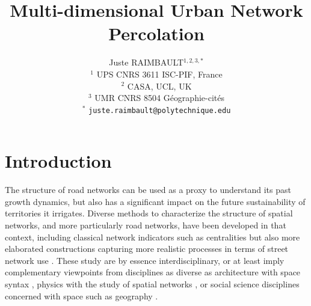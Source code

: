 \documentclass{article}
\begin{document}
\title{Multi-dimensional Urban Network Percolation}



\author{Juste RAIMBAULT$^{1,2,3,\ast}$\\
$^1$ UPS CNRS 3611 ISC-PIF, France\\
$^2$ CASA, UCL, UK\\
$^3$ UMR CNRS 8504 G{\'e}ographie-cit{\'e}s\\\medskip
$^{\ast}$ \texttt{juste.raimbault@polytechnique.edu}
}

\date{}

\maketitle



\section{Introduction}



The structure of road networks can be used as a proxy to understand its past growth dynamics, but also has a significant impact on the future sustainability of territories it irrigates. Diverse methods to characterize the structure of spatial networks, and more particularly road networks, have been developed in that context, including classical network indicators such as centralities \citep{crucitti2006centrality} but also more elaborated constructions capturing more realistic processes in terms of street network use \citep{lagesse2015spatial}. These study are by essence interdisciplinary, or at least imply complementary viewpoints from disciplines as diverse as architecture with space syntax \citep{hillier1976space}, physics with the study of spatial networks \citep{barthelemy2011spatial}, or social science disciplines concerned with space such as geography \citep{ducruet2014spatial}.
\end{document}
